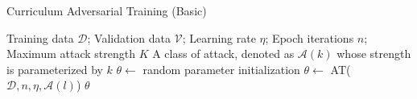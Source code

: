 \begin{algorithm}[H]
	\caption{Curriculum Adversarial Training (Basic)}
	\label{alg:curriculum-adv-train}
	\begin{algorithmic}[1]
		\Require Training data $\mathcal{D}$; Validation data $\mathcal{V}$; Learning rate $\eta$; Epoch iterations $n$; Maximum attack strength $K$
		\Require A class of attack, denoted as $\mathcal{A}(k)$ whose strength is parameterized by $k$
		\State $\theta \gets$ random parameter initialization
			\Repeat
				\State $\theta \gets$ AT($\mathcal{D}, n, \eta, \mathcal{A}(l)$)
		\EndFor
		\State \Return $\theta$
	\end{algorithmic}
\end{algorithm}
